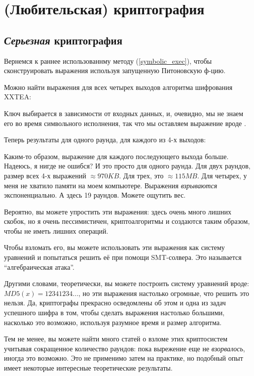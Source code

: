 \section{(Любительская) криптография}
\label{crypto}

\subsection{\textit{Серьезная} криптография}

Вернемся к раннее использованнму методу (\ref{symbolic_exec}), чтобы сконструировать выражения используя запущенную
Питоновскую ф-цию.

Можно найти выражения для всех четырех выходов алгоритма шифрования XXTEA:



Ключ выбирается в зависимости от входных данных, и, очевидно, мы не знаем его во время символьного исполнения,
так что мы оставляем выражение вроде .

Теперь результаты для одного раунда, для каждого из 4-х выходов:



Каким-то образом, выражение для каждого последующего выхода больше. Надеюсь, я нигде не ошибся?
И это просто для одного раунда.
Для двух раундов, размер всех 4-х выражений $\approx 970KB$.
Для трех, это $\approx 115MB$.
Для четырех, у меня не хватило памяти на моем компьютере.
Выражения \textit{взрываются} экспоненциально.
А здесь 19 раундов.
Можете ощутить вес.

Вероятно, вы можете упростить эти выражения: здесь очень много лишних скобок,
но я очень пессимистичен, криптоалгоритмы и создаются таким образом, чтобы не иметь лишних операций.

Чтобы взломать его, вы можете использовать эти выражения как систему уравнений и попытаться решить её при помощи SMT-солвера.
Это называется ``алгебраическая атака''.

Другими словами, теоретически, вы можете построить систему уравнений вроде: $MD5(x)=12341234...$,
но эти выражения настолько огромные, что решить это нельзя.
Да, криптографы прекрасно осведомлены об этом и одна из задач успешного шифра в том, чтобы сделать выражения
настолько большими, насколько это возможно, используя разумное время и размер алгоритма.

Тем не менее, вы можете найти много статей о взломе этих криптосистем учитывая сокращенное количество раундов:
пока вырежение еще не \textit{взорвалось}, иногда это возможно.
Это не применимо затем на практике, но подобный опыт имеет некоторые интересные теоретические результаты.

